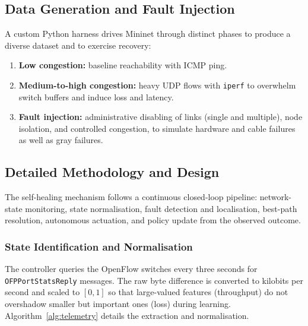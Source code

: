 \documentclass[12pt,a4paper]{report}
\begin{document}
\subsection{Data Generation and Fault Injection}
A custom Python harness drives Mininet through distinct phases to produce a diverse dataset
and to exercise recovery:
\begin{enumerate}
\item \textbf{Low congestion:} baseline reachability with ICMP ping.
\item \textbf{Medium-to-high congestion:} heavy UDP flows with \texttt{iperf} to overwhelm
switch buffers and induce loss and latency.
\item \textbf{Fault injection:} administrative disabling of links (single and multiple),
node isolation, and controlled congestion, to simulate hardware and cable failures as well
as gray failures.
\end{enumerate}

\subsection{Detailed Methodology and Design}
The self-healing mechanism follows a continuous closed-loop pipeline: network-state
monitoring, state normalisation, fault detection and localisation, best-path resolution,
autonomous actuation, and policy update from the observed outcome.

\subsubsection{State Identification and Normalisation}
The controller queries the OpenFlow switches every three seconds for
\texttt{OFPPortStatsReply} messages. The raw byte difference is converted to kilobits per
second and scaled to $[0,1]$ so that large-valued features (throughput) do not overshadow
smaller but important ones (loss) during learning. Algorithm~\ref{alg:telemetry} details the
extraction and normalisation.
\end{document}
